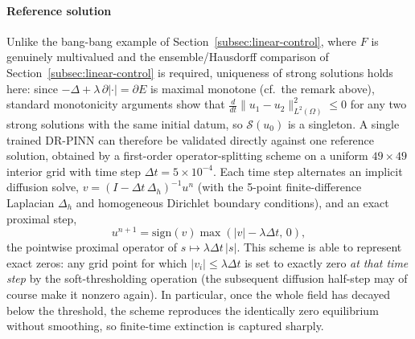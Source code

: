 \documentclass[11pt]{elsarticle}
\theoremstyle{definition}
\theoremstyle{remark}
\numberwithin{equation}{section}
\begin{document}
\paragraph{Reference solution}
Unlike the bang-bang example of Section~\ref{subsec:linear-control}, where
$F$ is genuinely multivalued and the ensemble/Hausdorff comparison of
Section~\ref{subsec:linear-control} is required, uniqueness of strong
solutions holds here: since $-\Delta+\lambda\,\partial|\cdot|=\partial E$
is maximal monotone (cf.\ the remark above), standard monotonicity
arguments show that
$\tfrac{d}{dt}\|u_1-u_2\|_{L^2(\Omega)}^2\le0$ for any two strong solutions
with the same initial datum, so $\mathcal{S}(u_0)$ is a singleton. A single trained
DR-PINN can therefore be validated directly against one reference solution,
obtained by a first-order operator-splitting scheme on a uniform
$49\times49$ interior grid with time step $\Delta t=5\times10^{-4}$.
Each time step alternates an implicit diffusion solve,
$v=(I-\Delta t\,\Delta_h)^{-1}u^n$ (with the 5-point finite-difference
Laplacian $\Delta_h$ and homogeneous Dirichlet boundary conditions), and an
exact proximal step,
\[
u^{n+1}=\mathrm{sign}(v)\max(|v|-\lambda\Delta t,\,0),
\]
the pointwise proximal operator of $s\mapsto\lambda\Delta t\,|s|$.
This scheme is able to represent exact zeros: any grid point for which
$|v_i|\le\lambda\Delta t$ is set to exactly zero \emph{at that time
step} by the soft-thresholding operation (the subsequent diffusion
half-step may of course make it nonzero again). In particular, once the
whole field has decayed below the threshold, the scheme reproduces the
identically zero equilibrium without smoothing, so finite-time extinction
is captured sharply.
\end{document}
